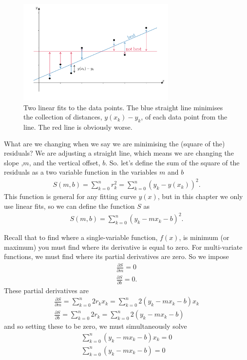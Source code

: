 \begin{figure}[H]
	\begin{center}
	\includegraphics[width=0.7\textwidth]{figures/ch4_least_squares_defn.pdf} 
	  \caption{Two linear fits to the data points. The blue straight line minimises the collection of distances, $y(x_k)-y_k$, of each data point from the line. The red line is obviously worse.} \label{fig:ch4_defintion}
	\end{center}
\end{figure}

What are we changing when we say we are minimising the (square of the) residuals? We are adjusting a straight line, which means we are changing the slope ,$m$, and the vertical offset, $b$. So. let's define the sum of the square of the residuals as a two variable function in the variables $m$ and $b$
\begin{align*}
S(m,b) = \sum_{k=0}^n r_k^2 = \sum_{k=0}^n \left(y_k - y(x_k)\right)^2.
\end{align*}
This function is general for any fitting curve $y(x)$, but in this chapter we only use linear fits, so we can define the function $S$ as
\begin{align*}
S(m,b) = \sum_{k=0}^n \left(y_k - mx_k - b\right)^2.
\end{align*}

Recall that to find where a single-variable function, $f(x)$, is minimum (or maximum) you must find where its derivative is equal to zero. For multi-variate functions, we must find where its partial derivatives are zero. So we impose
\begin{align*}
\frac{\partial S}{\partial m} = 0 \\
\frac{\partial S}{\partial b} = 0.
\end{align*}
These partial derivatives are
\begin{align*}
\frac{\partial S}{\partial m} = \sum_{k=0}^n 2 r_k x_k = \sum_{k=0}^n 2 \left(y_k - mx_k - b\right) x_k\\
\frac{\partial S}{\partial b} = \sum_{k=0}^n 2 r_k = \sum_{k=0}^n 2 \left(y_k - mx_k - b\right)
\end{align*}
and so setting these to be zero, we must simultaneously solve
\begin{align}
\sum_{k=0}^n \left(y_k - mx_k - b\right) x_k = 0  \label{eq:dsdm}\\
\sum_{k=0}^n \left(y_k - mx_k - b\right) = 0 \label{eq:dsdb}
\end{align}


